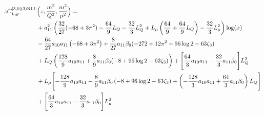 \documentclass[a4paper]{article}
\begin{document}
\begin{equation}
	\begin{split}
		z C_{L,g}^{[3, 0](3) \rm NLL}&\Bigl(z,\frac{m^2}{Q^2},\frac{m^2}{\mu^2}\Bigr)= \\
		& + a_{11}^2 \left(\frac{32}{27} (-68 + 3 \pi^2) - \frac{64}{9} L_Q - \frac{32}{3} L_Q^2 + L_\mu \left(\frac{64}{9} + \frac{64}{9} L_Q\right)- \frac{32}{3} L_\mu^2\right) \log(x) \\
		& -\frac{64}{27} a_{10} a_{11} \left(-68 + 3 \pi^2\right) + \frac{8}{27} a_{11} \beta_0 (-272 + 12 \pi^2 + 96 \log 2 - 63 \zeta_3) \\
		& + L_Q \left(\frac{128}{9} a_{10} a_{11} + \frac{8}{9} a_{11} \beta_0 (-8 + 96 \log 2 - 63 \zeta_3)\right) + \Biggl[ \frac{64}{3} a_{10} a_{11} - \frac{32}{3} a_{11} \beta_0\Biggr] L_Q^2 \\
		& + L_\mu \Biggl[- \frac{128}{9} a_{10} a_{11} - \frac{8}{9} a_{11} \beta_0 \left(-8 + 96 \log 2 - 63 \zeta_3\right) + \left(- \frac{128}{3} a_{10} a_{11} + \frac{64}{3} a_{11} \beta_0 \right) L_Q \Biggr] \\
		& + \Biggl[\frac{64}{3} a_{10} a_{11} - \frac{32}{3} a_{11} \beta_0 \Biggr] L_\mu^2
	\end{split}
\end{equation}
\end{document}
